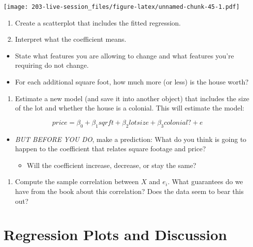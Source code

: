 \documentclass[
]{book}
\providecommand{\tightlist}{%
  \setlength{\itemsep}{0pt}\setlength{\parskip}{0pt}}
\theoremstyle{definition}
\theoremstyle{definition}
\theoremstyle{definition}
\theoremstyle{definition}
\theoremstyle{remark}
\begin{document}
\texttt{[image: 203-live-session\_files/figure-latex/unnamed-chunk-45-1.pdf]}

\begin{enumerate}
\def\labelenumi{\arabic{enumi}.}
\setcounter{enumi}{4}
\item
  Create a scatterplot that includes the fitted regression.
\item
  Interpret what the coefficient means.
\end{enumerate}

\begin{itemize}
\tightlist
\item
  State what features you are allowing to change and what features you're requiring do not change.
\item
  For each additional square foot, how much more (or less) is the house worth?
\end{itemize}

\begin{enumerate}
\def\labelenumi{\arabic{enumi}.}
\setcounter{enumi}{6}
\tightlist
\item
  Estimate a new model (and save it into another object) that includes the size of the lot and whether the house is a colonial. This will estimate the model:
\end{enumerate}

\[ 
price = \beta_{0} + \beta_{1} sqrft + \beta_{2} lotsize + \beta_{3} colonial? + e
\]

\begin{itemize}
\tightlist
\item
  \emph{BUT BEFORE YOU DO}, make a prediction: What do you think is going to happen to the coefficient that relates square footage and price?

  \begin{itemize}
  \tightlist
  \item
    Will the coefficient increase, decrease, or stay the same?
  \end{itemize}
\end{itemize}

\begin{enumerate}
\def\labelenumi{\arabic{enumi}.}
\setcounter{enumi}{6}
\tightlist
\item
  Compute the sample correlation between \(X\) and \(e_i\). What guarantees do we have from the book about this correlation? Does the data seem to bear this out?
\end{enumerate}

\hypertarget{regression-plots-and-discussion}{%
\section{Regression Plots and Discussion}\label{regression-plots-and-discussion}}
\end{document}

